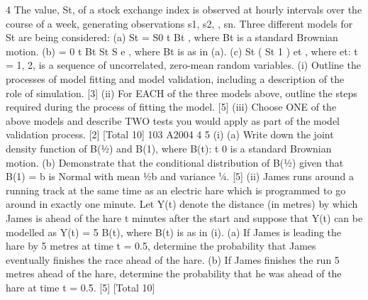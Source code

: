 \documentclass[a4paper,12pt]{article}
\begin{document}
\begin{enumerate}

4 The value, St, of a stock exchange index is observed at hourly intervals over the
course of a week, generating observations s1, s2, , sn.
Three different models for St are being considered:
(a) St = S0 t Bt , where Bt is a standard Brownian motion.
(b) = 0 t Bt
St S e , where Bt is as in (a).
(c) St ( St 1 ) et , where {et: t = 1, 2, } is a sequence of
uncorrelated, zero-mean random variables.
(i) Outline the processes of model fitting and model validation, including a
description of the role of simulation. [3]
(ii) For EACH of the three models above, outline the steps required during the
process of fitting the model. [5]
(iii) Choose ONE of the above models and describe TWO tests you would apply as
part of the model validation process. [2]
[Total 10]
103 A2004 4
5 (i) (a) Write down the joint density function of B(½) and B(1), where
{B(t): t 0} is a standard Brownian motion.
(b) Demonstrate that the conditional distribution of B(½) given that
B(1) = b is Normal with mean ½b and variance ¼.
[5]
(ii) James runs around a running track at the same time as an electric hare which
is programmed to go around in exactly one minute. Let Y(t) denote the
distance (in metres) by which James is ahead of the hare t minutes after the
start and suppose that Y(t) can be modelled as Y(t) = 5 B(t), where B(t) is as
in (i).
(a) If James is leading the hare by 5 metres at time t = 0.5, determine the
probability that James eventually finishes the race ahead of the hare.
(b) If James finishes the run 5 metres ahead of the hare, determine the
probability that he was ahead of the hare at time t = 0.5.
[5]
[Total 10]


\end{enumerate}
\end{document}
